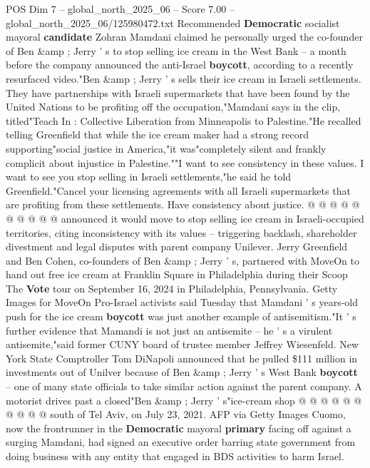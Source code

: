 \begin{textsample}{POS Dim 7 – global\_north\_2025\_06 – Score 7.00 – global\_north\_2025\_06/125980472.txt}  \label{ex:f7_pos_376}
Recommended \textbf{Democratic} socialist mayoral \textbf{candidate} Zohran Mamdani claimed he personally urged the co-founder of Ben \&amp ; Jerry ' s to stop selling ice cream in the West Bank -- a month before the company announced the anti-Israel \textbf{boycott}, according to a recently resurfaced video."Ben \&amp ; Jerry ' s sells their ice cream in Israeli settlements.
They have partnerships with Israeli supermarkets that have been found by the United Nations to be profiting off the occupation,"Mamdani says in the clip, titled"Teach In : Collective Liberation from Minneapolis to Palestine."He recalled telling Greenfield that while the ice cream maker had a strong record supporting"social justice in America,"it was"completely silent and frankly complicit about injustice in Palestine.""I want to see consistency in these values.
I want to see you stop selling in Israeli settlements,"he said he told Greenfield."Cancel your licensing agreements with all Israeli supermarkets that are profiting from these settlements.
Have consistency about justice. @ @ @ @ @ @ @ @ @ @ announced it would move to stop selling ice cream in Israeli-occupied territories, citing inconsistency with its values -- triggering backlash, shareholder divestment and legal disputes with parent company Unilever.
Jerry Greenfield and Ben Cohen, co-founders of Ben \&amp ; Jerry ' s, partnered with MoveOn to hand out free ice cream at Franklin Square in Philadelphia during their Scoop The \textbf{Vote} tour on September 16, 2024 in Philadelphia, Pennsylvania.
Getty Images for MoveOn Pro-Israel activists said Tuesday that Mamdani ' s years-old push for the ice cream \textbf{boycott} was just another example of antisemitism."It ' s further evidence that Mamandi is not just an antisemite -- he ' s a virulent antisemite,"said former CUNY board of trustee member Jeffrey Wiesenfeld.
New York State Comptroller Tom DiNapoli announced that he pulled \$111 million in investments out of Unilver because of Ben \&amp ; Jerry ' s West Bank \textbf{boycott} -- one of many state officials to take similar action against the parent company.
A motorist drives past a closed"Ben \&amp ; Jerry ' s"ice-cream shop @ @ @ @ @ @ @ @ @ @ south of Tel Aviv, on July 23, 2021.
AFP via Getty Images Cuomo, now the frontrunner in the \textbf{Democratic} mayoral \textbf{primary} facing off against a surging Mamdani, had signed an executive order barring state government from doing business with any entity that engaged in BDS activities to harm Israel.

\end{textsample}
